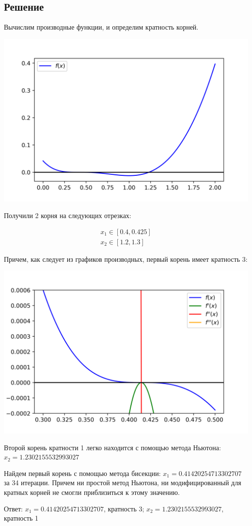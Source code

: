 \documentclass[a4paper,12pt]{report} %
\begin{document}
\subsection*{Решение}

Вычислим производные функции, и определим кратность корней.

\noindent\includegraphics{2.3_plot.png}

 Получили 2 корня на следующих отрезках:

\begin{gather*}
	x_1 \in [0.4, 0.425] \\
	x_2 \in [1.2, 1.3]
\end{gather*}

Причем, как следует из графиков производных, первый корень имеет кратность 3:

\noindent\includegraphics{2.3_plot_d.png}

Второй корень кратности 1 легко находится с помощью метода Ньютона: $ x_2 = 1.2302155532993027$

Найдем первый корень с помощью метода бисекции: $ x_1 = 0.41420254713302707 $ за 34 итерации.
Причем ни простой метод Ньютона, ни модифицированный для кратных корней не смогли приблизиться к этому значению.

Ответ: $ x_1 = 0.41420254713302707$, кратность 3; $x_2 =  1.2302155532993027$, кратность 1
\end{document}
